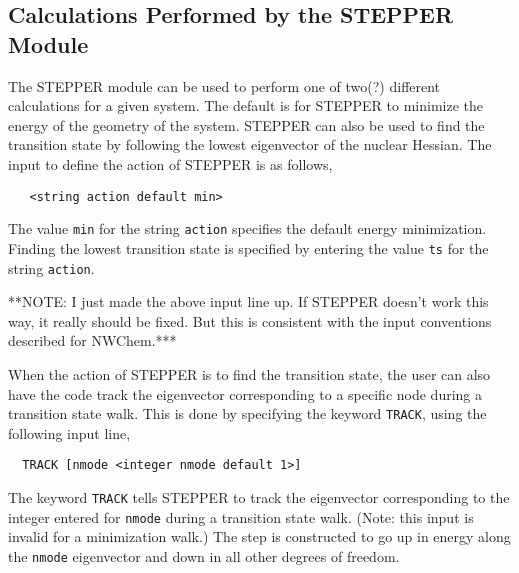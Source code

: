 



\subsection{Calculations Performed by the STEPPER Module}

The STEPPER module can be used to perform one of two(?) different calculations
for a given system.  The default is for STEPPER to minimize the
energy of the geometry of the system.  STEPPER can also be used to
find the transition state by following the lowest eigenvector of the nuclear
Hessian.  The input to define the action of STEPPER is as follows,

\begin{verbatim}
   <string action default min>
\end{verbatim}

The value \verb+min+ for the string \verb+action+ specifies the default
energy minimization.  Finding the lowest transition state is specified
by entering the value \verb+ts+ for the string \verb+action+.

\Large
**NOTE: I just made the above input line up.  If STEPPER doesn't work this
way, it really should be fixed.  But this is consistent with the input
conventions described for NWChem.***
\normalsize

When the action of STEPPER is to find the transition state, the user
can also have the code track the eigenvector corresponding to a specific
node during a transition state walk.  This is done by specifying the
keyword \verb+TRACK+, using the following input line,

\begin{verbatim}
  TRACK [nmode <integer nmode default 1>]
\end{verbatim}

The keyword \verb+TRACK+ tells STEPPER to track the eigenvector 
corresponding to the integer entered for \verb+nmode+ during a 
transition state walk.  (Note: this input is invalid
for a minimization walk.)  The step is constructed to go up in energy
along the \verb+nmode+ eigenvector and down in all other degrees of
freedom.

